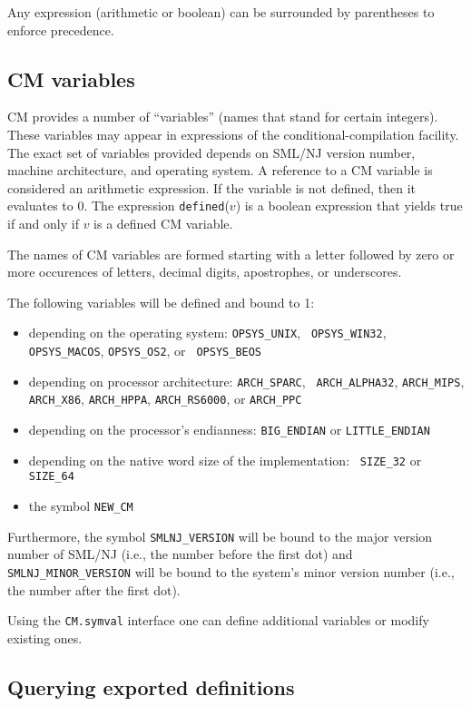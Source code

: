 \documentclass[titlepage,letterpaper]{article}
\begin{document}
Any expression (arithmetic or boolean) can be surrounded by
parentheses to enforce precedence.

\subsection{CM variables}
\label{sec:cmvars}

CM provides a number of ``variables'' (names that stand for certain
integers). These variables may appear in expressions of the
conditional-compilation facility. The exact set of variables provided
depends on SML/NJ version number, machine architecture, and
operating system.  A reference to a CM variable is considered an
arithmetic expression. If the variable is not defined, then it
evaluates to 0.  The expression {\tt defined}($v$) is a boolean
expression that yields true if and only if $v$ is a defined CM
variable.

The names of CM variables are formed starting with a letter followed
by zero or more occurences of letters, decimal digits, apostrophes, or
underscores.

The following variables will be defined and bound to 1:
\begin{itemize}
\item depending on the operating system: {\tt OPSYS\_UNIX}, {\tt
OPSYS\_WIN32}, {\tt OPSYS\_MACOS}, {\tt OPSYS\_OS2}, or {\tt
OPSYS\_BEOS}
\item depending on processor architecture: {\tt ARCH\_SPARC}, {\tt
ARCH\_ALPHA32}, {\tt ARCH\_MIPS}, {\tt ARCH\_X86}, {\tt ARCH\_HPPA},
{\tt ARCH\_RS6000}, or {\tt ARCH\_PPC}
\item depending on the processor's endianness: {\tt BIG\_ENDIAN} or
{\tt LITTLE\_ENDIAN}
\item depending on the native word size of the implementation: {\tt
SIZE\_32} or {\tt SIZE\_64}
\item the symbol {\tt NEW\_CM}
\end{itemize}

Furthermore, the symbol {\tt SMLNJ\_VERSION} will be bound to the
major version number of SML/NJ (i.e., the number before the first dot)
and {\tt SMLNJ\_MINOR\_VERSION} will be bound to the system's minor
version number (i.e., the number after the first dot).

Using the {\tt CM.symval} interface one can define additional
variables or modify existing ones.

\subsection{Querying exported definitions}
\end{document}
